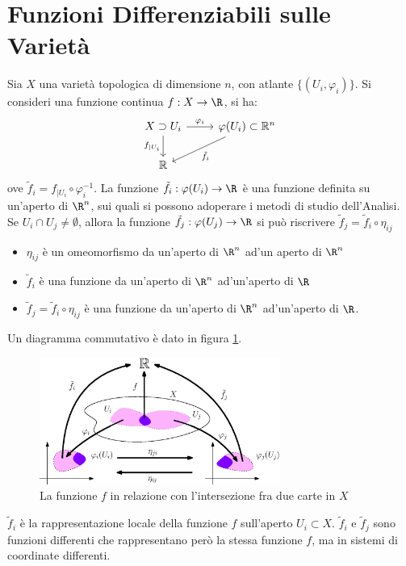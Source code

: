 \documentclass[10pt, letterpaper]{report}
\begin{document}
\section{Funzioni Differenziabili sulle Varietà}
Sia $X$ una varietà topologica di dimensione $n$, con atlante $\{(U_i,\varphi_i)\}$. Si consideri una funzione continua $f:X\rightarrow\R$, si ha:
\[
\begin{tikzcd}
X \supset U_i \arrow[r, "{\varphi}_i"] \arrow[d, "f_{|U_i}"'] & \varphi(U_i) \subset \mathbb{R}^n \arrow[dl, "\tilde{f}_i"] \\
\mathbb{R} &
\end{tikzcd}
\]
ove $\tilde{f}_i=f_{|U_i}\circ\varphi_i^{-1}$. La funzione $\tilde{f}_i:\varphi(U_i)\rightarrow \R$ è una funzione definita su un'aperto di $\R^n$, sui quali si possono adoperare i metodi di studio dell'Analisi. 
Se $U_i\cap U_j\ne\emptyset$, allora la funzione $\tilde f_j:\varphi(U_j)\rightarrow \R$ si può riscrivere $\tilde f_j=\tilde f_i\circ \eta_{ij}$\begin{itemize}
    \item $\eta_{ij}$ è un omeomorfismo da un'aperto di $\R^n$ ad'un aperto di $\R^n$
    \item $\tilde f_i$ è una funzione da un'aperto di $\R^n$ ad'un'aperto di $\R$
    \item $\tilde f_j=\tilde f_i\circ \eta_{ij}$ è una funzione da un'aperto di $\R^n$ ad'un'aperto di $\R$.
\end{itemize}
Un diagramma commutativo è dato in figura \ref{img:intersezione_carte_fun}.
\begin{figure}[h!]
    \center
    \includegraphics[width=0.7\textwidth ]{images/intersezione_carte_func.eps}
    \caption{La funzione $f$ in relazione con l'intersezione fra due carte in $X$}
    \label{img:intersezione_carte_fun}
\end{figure}
$\tilde f_i$ è la rappresentazione locale della funzione $f$ sull'aperto $U_i\subset X$. $\tilde f_i$ e $\tilde f_j$ sono funzioni differenti che rappresentano però la stessa funzione $f$, ma in sistemi di coordinate differenti.
\end{document}
